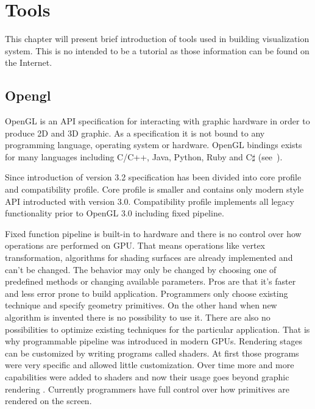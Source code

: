 

\chapter{Tools}


\graphicspath{{tools/figures/}}


This chapter will present brief introduction of tools used in building visualization system. This is no intended to be a tutorial as those information can be found on the Internet. 

\section{Opengl}
OpenGL is an API specification for interacting with graphic hardware in order to produce 2D and 3D graphic. 
As a specification it is not bound to any programming language, operating system or hardware. 
OpenGL bindings exists for many languages including C/C++, Java, Python, Ruby and C$\sharp$ (see~\cite{OglBindings}). 

Since introduction of version 3.2 specification has been divided into core profile and compatibility profile. Core profile is smaller and contains only modern style API introducted with version 3.0. Compatibility profile implements all legacy functionality prior to OpenGL 3.0 including fixed pipeline. 

Fixed function pipeline is built-in to hardware and there is no control over how operations are performed on GPU. That means operations like vertex transformation, algorithms for shading surfaces are already implemented and can't be changed. The behavior may only be changed by choosing one of predefined methods or changing available parameters. Pros are that it's faster and less error prone to build application. Programmers only choose existing technique and specify geometry primitives. On the other hand when new algorithm is invented there is no possibility to use it. There are also no possibilities to optimize existing techniques for the particular application. 
That is why programmable pipeline was introduced in modern GPUs. Rendering stages can be customized by writing programs called shaders. At first those programs were very specific and allowed little customization. Over time more and more capabilities were added to shaders and now their usage goes beyond graphic rendering \cite[Part~VI]{GPUGems3}. Currently programmers have full control over how primitives are rendered on the screen.

